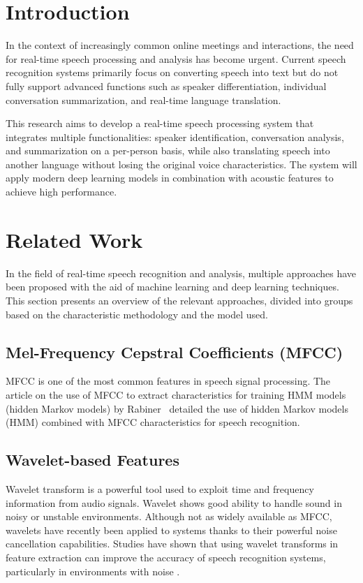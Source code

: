 \documentclass[conference]{IEEEtran}
\begin{document}
\section{Introduction}
In the context of increasingly common online meetings and interactions, the need for real-time speech processing and analysis has become urgent. Current speech recognition systems primarily focus on converting speech into text but do not fully support advanced functions such as speaker differentiation, individual conversation summarization, and real-time language translation.

This research aims to develop a real-time speech processing system that integrates multiple functionalities: speaker identification, conversation analysis, and summarization on a per-person basis, while also translating speech into another language without losing the original voice characteristics. The system will apply modern deep learning models in combination with acoustic features to achieve high performance.



\section{Related Work}

In the field of real-time speech recognition and analysis, multiple approaches have been proposed with the aid of machine learning and deep learning techniques. This section presents an overview of the relevant approaches, divided into groups based on the characteristic methodology and the model used.

\subsection{Mel-Frequency Cepstral Coefficients (MFCC)}

MFCC is one of the most common features in speech signal processing. The article on the use of MFCC to extract characteristics for training HMM models (hidden Markov models) by Rabiner~\cite{rabiner1989tutorial} detailed the use of hidden Markov models (HMM) combined with MFCC characteristics for speech recognition.
\subsection{Wavelet-based Features}

Wavelet transform is a powerful tool used to exploit time and frequency information from audio signals. Wavelet shows good ability to handle sound in noisy or unstable environments. Although not as widely available as MFCC, wavelets have recently been applied to systems thanks to their powerful noise cancellation capabilities. Studies have shown that using wavelet transforms in feature extraction can improve the accuracy of speech recognition systems, particularly in environments with noise \cite{gupta2003robust, wang2008robust}.
\end{document}
